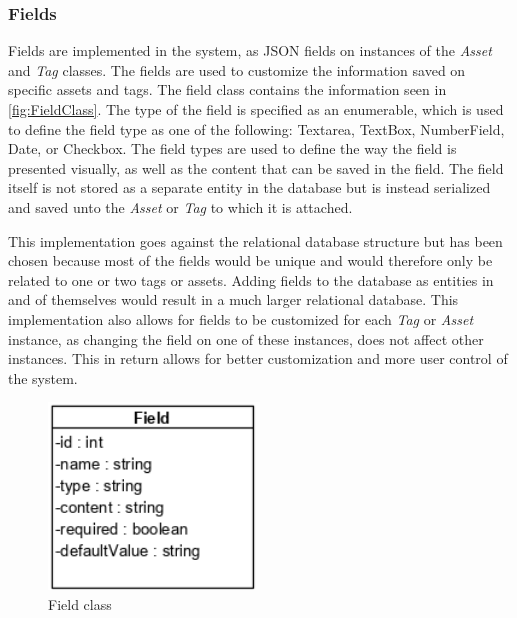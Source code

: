 \subsubsection{Fields}
Fields are implemented in the system, as JSON fields on instances of the \textit{Asset} and \textit{Tag} classes. The fields are used to customize the information saved on specific assets and tags. The field class contains the information seen in \autoref{fig:FieldClass}. The type of the field is specified as an enumerable, which is used to define the field type as one of the following: Textarea, TextBox, NumberField, Date, or Checkbox. The field types are used to define the way the field is presented visually, as well as the content that can be saved in the field. The field itself is not stored as a separate entity in the database but is instead serialized and saved unto the \textit{Asset} or \textit{Tag} to which it is attached.
\par
This implementation goes against the relational database structure but has been chosen because most of the fields would be unique and would therefore only be related to one or two tags or assets. Adding fields to the database as entities in and of themselves would result in a much larger relational database. This implementation also allows for fields to be customized for each \textit{Tag} or \textit{Asset} instance, as changing the field on one of these instances, does not affect other instances. This in return allows for better customization and more user control of the system.

\begin{figure}[H]
    \centering
    \includegraphics[width=0.5\textwidth]{figures/Classes/FieldAttributes.png}
    \caption{Field class}
    \label{fig:FieldClass}
\end{figure}